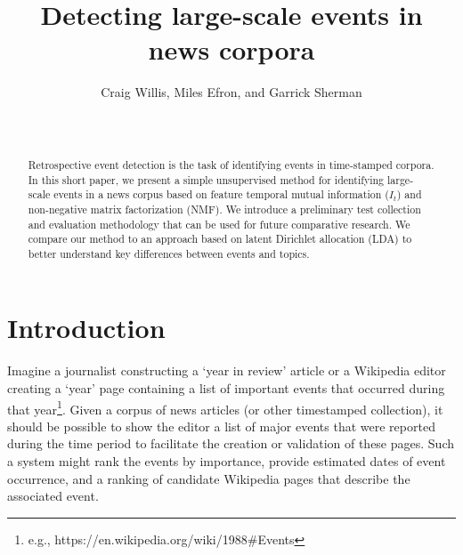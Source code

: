 \documentclass{sig-alternate}
\begin{document}

\author{
Craig Willis, Miles Efron, and Garrick Sherman \\
       \\
       \\
}

\title{Detecting large-scale events in news corpora}

\maketitle
\begin{abstract}
Retrospective event detection is the task of identifying events in time-stamped corpora. In this short paper, we present a simple unsupervised method for identifying large-scale events in a news corpus based on feature temporal mutual information ($I_t$) and non-negative matrix factorization (NMF). We introduce a preliminary test collection and evaluation methodology that can be used for future comparative research. We compare our method to an approach based on latent Dirichlet allocation (LDA) to better understand key differences between events and topics.

\end{abstract}



\section{Introduction}

Imagine a journalist constructing a `year in review' article or a Wikipedia editor creating a `year' page containing a list of important events that occurred during that year\footnote{e.g., https://en.wikipedia.org/wiki/1988\#Events}. Given a corpus of news articles (or other timestamped collection), it should be possible to show the editor a list of major events that were reported during the time period to facilitate the creation or validation of these pages. Such a system might rank the events by importance, provide estimated dates of event occurrence, and a ranking of candidate Wikipedia pages that describe the associated event. 
\end{document}
